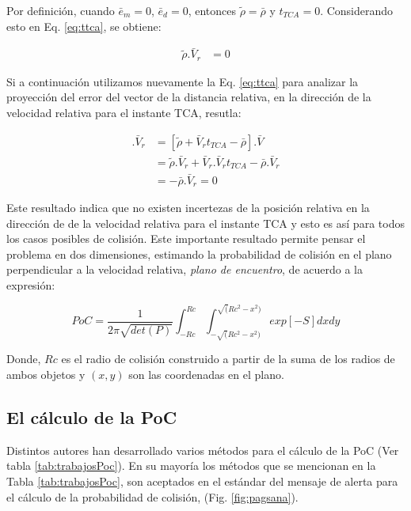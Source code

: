 Por definici\'on, cuando $\bar{e}_m=0$, $\bar{e}_d=0$, entonces $\tilde{\rho}=\bar{\rho}$ y $t_{TCA}=0$. Considerando esto en Eq. \ref{eq:ttca}, se obtiene:


\begin{align*}
  \tilde{\rho}.\bar{V}_r &= 0
\end{align*}

Si a continuaci\'on utilizamos nuevamente la Eq. \ref{eq:ttca} para analizar la proyecci\'on del error del vector de la distancia relativa, en la direcci\'on de la velocidad relativa para el instante TCA, resutla:

\begin{align*}
  [\tilde{\rho}(t_{TCA})-\bar{\rho}].\bar{V}_r &= [\tilde{\rho}+\bar{V}_rt_{TCA}-\bar{\rho}].\bar{V}\\
  &=\tilde{\rho}.\bar{V}_r +\bar{V}_r .\bar{V}_r t_{TCA}-\bar{\rho}.\bar{V}_r\\
  &=-\bar{\rho}.\bar{V}_r=0
\end{align*}

Este resultado indica que no existen incertezas de la posici\'on relativa en la direcci\'on de de la velocidad relativa para el instante TCA y esto es as\'i para todos los casos posibles de colisi\'on. Este importante resultado permite pensar el problema en dos dimensiones, estimando la probabilidad de colisi\'on en el plano perpendicular a la velocidad relativa, {\it{plano de encuentro}}, de acuerdo a la expresi\'on: 

\begin{equation}
 PoC=\frac{1}{2 \pi \sqrt{det(P)}}\int_{-Rc}^{Rc}\int_{-\sqrt(Rc^{2}-x^{2})}^{\sqrt(Rc^{2}-x^{2})}exp [-S] dxdy
 \label{eq:pocintegralarea}
\end{equation}

Donde, $Rc$ es el radio de colisi\'on construido a partir de la suma de los radios de ambos objetos y $(x,y)$ son las coordenadas en el plano. 


\subsection{El c\'alculo de la PoC}\label{sec:calculoPoC}

Distintos autores han desarrollado varios m\'etodos para el c\'alculo de la PoC (Ver tabla \ref{tab:trabajosPoc}).
En su mayor\'ia los m\'etodos que se mencionan en la Tabla \ref{tab:trabajosPoc}, son aceptados en el est\'andar del mensaje de alerta para el c\'alculo de la probabilidad de colisi\'on, (Fig. \ref{fig:pagsana}).

